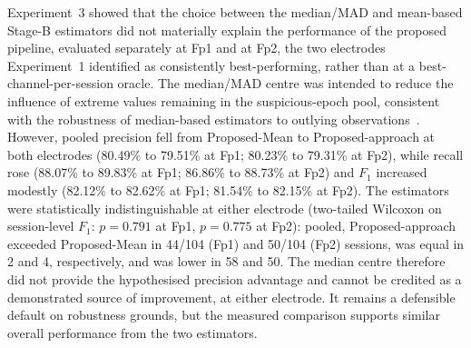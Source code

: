 Experiment~3 showed that the choice between the median/MAD and mean-based Stage-B estimators did not materially explain the performance of the proposed pipeline, evaluated separately at Fp1 and at Fp2, the two electrodes Experiment~1 identified as consistently best-performing, rather than at a best-channel-per-session oracle. The median/MAD centre was intended to reduce the influence of extreme values remaining in the suspicious-epoch pool, consistent with the robustness of median-based estimators to outlying observations~\citep{leys2013detecting,rousseeuw1993alternatives}. However, pooled precision fell from Proposed-Mean to Proposed-approach at both electrodes (80.49\% to 79.51\% at Fp1; 80.23\% to 79.31\% at Fp2), while recall rose (88.07\% to 89.83\% at Fp1; 86.86\% to 88.73\% at Fp2) and $F_1$ increased modestly (82.12\% to 82.62\% at Fp1; 81.54\% to 82.15\% at Fp2). The estimators were statistically indistinguishable at either electrode (two-tailed Wilcoxon on session-level $F_1$: $p=0.791$ at Fp1, $p=0.775$ at Fp2): pooled, Proposed-approach exceeded Proposed-Mean in 44/104 (Fp1) and 50/104 (Fp2) sessions, was equal in 2 and 4, respectively, and was lower in 58 and 50. The median centre therefore did not provide the hypothesised precision advantage and cannot be credited as a demonstrated source of improvement, at either electrode. It remains a defensible default on robustness grounds, but the measured comparison supports similar overall performance from the two estimators.
